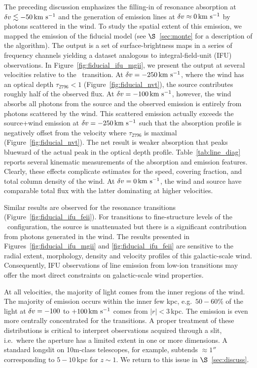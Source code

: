 \documentclass[12pt,preprint]{aastex}
\begin{document}
The preceding discussion emphasizes the filling-in of resonance
absorption at $\delta v
\lesssim -50 \, {\rm km~s^{-1}}$ and the generation of emission lines at $\delta v \approx
0 \, {\rm km~s^{-1}}$ by photons scattered in the wind.  To study the spatial
extent of this emission, we mapped the emission of the fiducial
model (see $\S$~\ref{sec:monte} for a description of the algorithm).
The output is a set of surface-brightness maps in a series of 
frequency channels yielding a
dataset analogous to integral-field-unit (IFU) observations.  In
Figure~\ref{fig:fiducial_ifu_mgii}, we present the output 
at several velocities relative to the \mgiia\
transition. At $\delta v = -250 \, {\rm km~s^{-1}}$, where the wind has an optical
depth $\tau_{2796} < 1$ (Figure~\ref{fig:fiducial_nvt}),
the source contributes roughly half of the observed flux.  
At $\delta v=-100 \, {\rm km~s^{-1}}$, however, the
wind absorbs all photons from the source and the observed emission is
entirely from photons scattered by the wind.  This scattered emission
actually exceeds the source+wind emission at 
$\delta v = -250 \, {\rm km~s^{-1}}$ such that the absorption profile is
negatively offset from the velocity where $\tau_{2796}$ is maximal
(Figure~\ref{fig:fiducial_nvt}).
The net result is
weaker  absorption that peaks blueward of the actual peak in the
optical depth profile.  
Table~\ref{tab:line_diag} reports several kinematic measurements of
the absorption and emission features.
Clearly, these effects complicate estimates for the
speed, covering fraction, and total column density of the wind.  At
$\delta v = 0 \, {\rm km~s^{-1}}$, the wind and source have comparable total flux with the
latter dominating at higher velocities.  

Similar results are observed for the  resonance
transitions (Figure~\ref{fig:fiducial_ifu_feii}).
For transitions to fine-structure levels of the \aconfig\
configuration, the source
is unattenuated but there is a significant contribution from photons
generated in the wind. 
The results presented in Figures~\ref{fig:fiducial_ifu_mgii} and
\ref{fig:fiducial_ifu_feii} are sensitive to the radial extent,
morphology, density and velocity profiles of this galactic-scale
wind.  Consequently, IFU observations of line emission from low-ion
transitions may offer the most direct constraints on galactic-scale
wind properties. 

At all velocities, the majority of light comes from the inner regions
of the wind. 
The majority of
 emission occurs within the inner few kpc, e.g.\ $50-60\%$
of the light at $\delta v=-100$ to $+100 \, {\rm km~s^{-1}}$
comes from $|r| < 3$\,kpc.
The emission
is even more centrally concentrated for the  transitions.
A proper treatment of these
distributions is critical to interpret observations
acquired through a slit, i.e.\ where the aperture has a limited extent
in one or more dimensions.  A standard longslit on 10m-class
telescopes, for example, subtends $\approx 1''$ corresponding to
$5-10$\,kpc for $z \sim 1$.    We return to this issue in
$\S$~\ref{sec:discuss}. 
\end{document}
